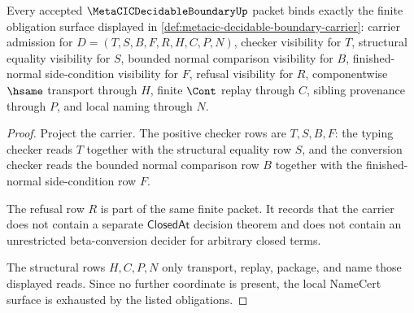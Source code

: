 \begin{theorem}
\label{thm:metacic-decidable-boundary-namecert-obligations}
Every accepted $\MetaCICDecidableBoundaryUp$ packet binds exactly the finite obligation surface displayed in \autoref{def:metacic-decidable-boundary-carrier}: carrier admission for $D=(T,S,B,F,R,H,C,P,N)$, checker visibility for $T$, structural equality visibility for $S$, bounded normal comparison visibility for $B$, finished-normal side-condition visibility for $F$, refusal visibility for $R$, componentwise $\hsame$ transport through $H$, finite $\Cont$ replay through $C$, sibling provenance through $P$, and local naming through $N$.
\end{theorem}
\begin{proof}
Project the carrier. The positive checker rows are $T,S,B,F$: the typing checker reads $T$ together with the structural equality row $S$, and the conversion checker reads the bounded normal comparison row $B$ together with the finished-normal side-condition row $F$.

The refusal row $R$ is part of the same finite packet. It records that the carrier does not contain a separate $\mathsf{ClosedAt}$ decision theorem and does not contain an unrestricted beta-conversion decider for arbitrary closed terms.

The structural rows $H,C,P,N$ only transport, replay, package, and name those displayed reads. Since no further coordinate is present, the local NameCert surface is exhausted by the listed obligations.
\end{proof}

